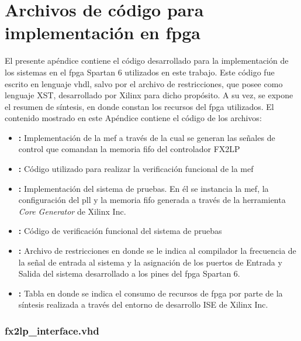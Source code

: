 \chapter{Archivos de código para implementación en \acrshort{fpga}}
\label{ap:vhdl}

	El presente apéndice contiene el código desarrollado para la implementación de los sistemas en el \acrshort{fpga} Spartan 6 utilizados en este trabajo. Este código fue escrito en lenguaje \acrshort{vhdl}, salvo por el archivo de restricciones, que posee como lenguaje XST, desarrollado por Xilinx para dicho propósito. A su vez, se expone el resumen de síntesis, en donde constan los recursos del \acrshort{fpga} utilizados.
 	El contenido mostrado en este Apéndice contiene el código de los archivos:
 	\begin{itemize}
		\item \textbf{:} Implementación de la \acrfull{mef} a través de la cual se generan las señales de control que comandan la memoria \acrshort{fifo} del controlador FX2LP 
		
		\item \textbf{:} Código utilizado para realizar la verificación funcional de la \acrshort{mef}
		
		\item \textbf{:} Implementación del sistema de pruebas. En él se instancia la \acrshort{mef}, la configuración del \acrshort{pll} y la memoria \acrshort{fifo} generada a través de la herramienta \textit{Core Generator} de Xilinx Inc. 
		
		\item \textbf{:} Código de verificación funcional del sistema de pruebas 

		\item \textbf{:} Archivo de restricciones en donde se le indica al compilador la frecuencia de la señal de entrada al sistema y la asignación de los puertos de Entrada y Salida del sistema desarrollado a los pines del \acrshort{fpga} Spartan 6.

		\item \textbf{:} Tabla en donde se indica el consumo de recursos de \acrshort{fpga} por parte de la síntesis realizada a través del entorno de desarrollo ISE de Xilinx Inc.
	\end{itemize}


	\subsection*{fx2lp\_interface.vhd}
		\label{ap:vhdl:iffx2}
		
	
